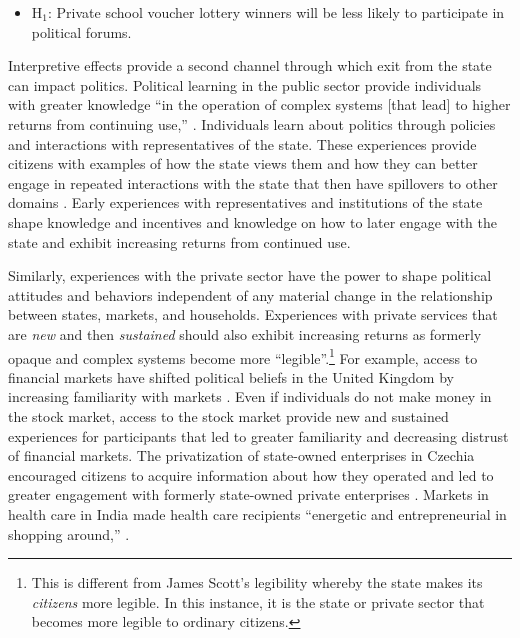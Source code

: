 \documentclass[hidelinks, 12pt, titlepage]{article}
\begin{document}
	\begin{itemize}
		\item H$_{1}$: Private school voucher lottery winners will be less likely to participate in political forums.
	\end{itemize}

	Interpretive effects provide a second channel through which exit from the state can impact politics.  Political learning in the public sector provide individuals with greater knowledge ``in the operation of complex systems [that lead] to higher returns from continuing use,'' \citep[254]{Pierson2000b}. Individuals learn about politics through policies and interactions with representatives of the state.  These experiences provide citizens with examples of how the state views them and how they can better engage in repeated interactions with the state that then have spillovers to other domains \citep{Pierson1993, Soss1999}. Early experiences with representatives and institutions of the state shape knowledge and incentives and knowledge on how to later engage with the state and exhibit increasing returns from continued use.

Similarly, experiences with the private sector have the power to shape political attitudes and behaviors independent of any material change in the relationship between states, markets, and households.  Experiences with private services that are \emph{new} and then \emph{sustained} should also exhibit increasing returns as formerly opaque and complex systems become more ``legible''.\footnote{This is different from James Scott's \citeyearpar{Scott1998} legibility whereby the state makes its \emph{citizens} more legible.  In this instance, it is the state or private sector that becomes more legible to ordinary citizens.}  For example, access to financial markets have shifted political beliefs in the United Kingdom by increasing familiarity with markets \citep{Margalit2020}.  Even if individuals do not make money in the stock market, access to the stock market provide new and sustained experiences for participants that led to greater familiarity and decreasing distrust of financial markets.  The privatization of state-owned enterprises in Czechia encouraged citizens to acquire information about how they operated and led to greater engagement with formerly state-owned private enterprises \citep{Earle2003}.  Markets in health care in India made health care recipients ``energetic and entrepreneurial in shopping around,'' \citep[133]{Jeffery2008}.
\end{document}

